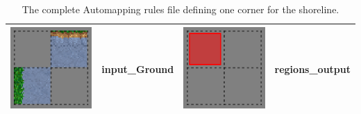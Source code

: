 \begin{table}
\begin{tabular}{|c|l|c|l|}
		\hline
		\includegraphics[scale=1]{Example/TheManaWorld/shorelinecorners/input_Ground.eps} & input\_Ground & \includegraphics[scale=1]{Example/TheManaWorld/shorelinecorners/regions_output.eps} & regions\_output\\
		\hline		
		\end{tabular}
		\caption{The complete Automapping rules file defining one corner for the shoreline.}
		\label{shorelinecorner_complete}
\end{table}

